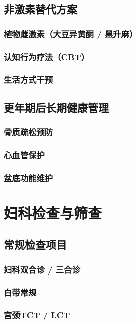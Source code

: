 \begin{enumerate}
\section{非激素替代方案}
\subsection{植物雌激素（大豆异黄酮 / 黑升麻）}
\subsection{认知行为疗法（CBT）}
\subsection{生活方式干预}

\section{更年期后长期健康管理}
\subsection{骨质疏松预防}
\subsection{心血管保护}
\subsection{盆底功能维护}

\chapter{妇科检查与筛查}

\section{常规检查项目}
\subsection{妇科双合诊 / 三合诊}
\subsection{白带常规}
\subsection{宫颈TCT / LCT}

\end{enumerate}
